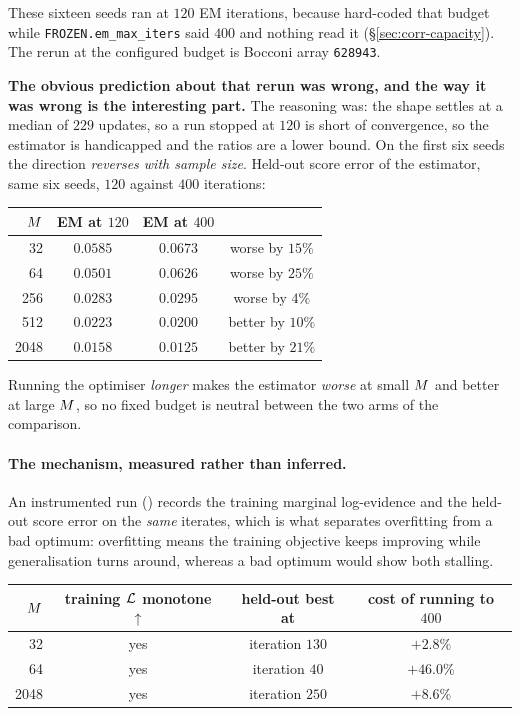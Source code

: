 \begin{pitfall}
These sixteen seeds ran at $120$ EM iterations, because  hard-coded that budget
while \texttt{FROZEN.em\_max\_iters} said $400$ and nothing read it (\S\ref{sec:corr-capacity}).
The rerun at the configured budget is Bocconi array \texttt{628943}.

\textbf{The obvious prediction about that rerun was wrong, and the way it was wrong is the
interesting part.} The reasoning was: the shape settles at a median of $229$ updates, so a run
stopped at $120$ is short of convergence, so the estimator is handicapped and the ratios are a
lower bound. On the first six seeds the direction \emph{reverses with sample size}. Held-out score
error of the estimator, same six seeds, $120$ against $400$ iterations:

\begin{center}\small
\begin{tabular}{@{}rccc@{}}
\toprule
$M$ & EM at $120$ & EM at $400$ & \\
\midrule
32   & $0.0585$ & $0.0673$ & worse by $15\%$ \\
64   & $0.0501$ & $0.0626$ & worse by $25\%$ \\
256  & $0.0283$ & $0.0295$ & worse by $4\%$ \\
512  & $0.0223$ & $0.0200$ & better by $10\%$ \\
2048 & $0.0158$ & $0.0125$ & better by $21\%$ \\
\bottomrule
\end{tabular}
\end{center}

\noindent
Running the optimiser \emph{longer} makes the estimator \emph{worse} at small $M$ and better
at large $M$, so no fixed budget is neutral between the two arms of the comparison.

\paragraph{The mechanism, measured rather than inferred.} An instrumented run
() records the training marginal log-evidence and
the held-out score error on the \emph{same} iterates, which is what separates overfitting from a
bad optimum: overfitting means the training objective keeps improving while generalisation turns
around, whereas a bad optimum would show both stalling.

\begin{center}\small
\begin{tabular}{@{}rccc@{}}
\toprule
$M$ & training $\mathcal{L}$ monotone $\uparrow$ & held-out best at & cost of running to $400$ \\
\midrule
32   & yes & iteration $130$ & $+2.8\%$ \\
64   & yes & iteration $40$  & $+46.0\%$ \\
2048 & yes & iteration $250$ & $+8.6\%$ \\
\bottomrule
\end{tabular}
\end{center}


\end{pitfall}

